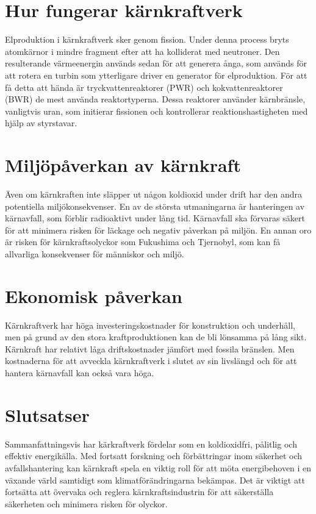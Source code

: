 \documentclass[11p]{article}
\begin{document}
    \section{Hur fungerar kärnkraftverk}
    Elproduktion i kärnkraftverk sker genom fission. Under denna process bryts atomkärnor i mindre fragment efter att ha kolliderat med neutroner. Den resulterande värmeenergin används sedan för att generera ånga, som används för att rotera en turbin som ytterligare driver en generator för elproduktion. För att få detta att hända är tryckvattenreaktorer (PWR) och kokvattenreaktorer (BWR) de mest använda reaktortyperna. Dessa reaktorer använder kärnbränsle, vanligtvis uran, som initierar fissionen och kontrollerar reaktionshastigheten med hjälp av styrstavar.\parencite{Nationalencyklopedin}

    \section{Miljöpåverkan av kärnkraft}
    Även om kärnkraften inte släpper ut någon koldioxid under drift har den andra potentiella miljökonsekvenser. En av de största utmaningarna är hanteringen av kärnavfall, som förblir radioaktivt under lång tid. Kärnavfall ska förvaras säkert för att minimera risken för läckage och negativ påverkan på miljön. En annan oro är risken för kärnkraftsolyckor som Fukushima och Tjernobyl, som kan få allvarliga konsekvenser för människor och miljö.\parencite{Naturvårdsverket}

    \section{Ekonomisk påverkan}
    Kärnkraftverk har höga investeringskostnader för konstruktion och underhåll, men på grund av den stora kraftproduktionen kan de bli lönsamma på lång sikt. Kärnkraft har relativt låga driftskostnader jämfört med fossila bränslen. Men kostnaderna för att avveckla kärnkraftverk i slutet av sin livslängd och för att hantera kärnavfall kan också vara höga.\parencite{energiforsk}

    \section{Slutsatser}
    Sammanfattningsvis har kärkraftverk fördelar som en koldioxidfri, pålitlig och effektiv energikälla. Med fortsatt forskning och förbättringar inom säkerhet och avfallshantering kan kärnkraft spela en viktig roll för att möta energibehoven i en växande värld samtidigt som klimatförändringarna bekämpas. Det är viktigt att fortsätta att övervaka och reglera kärnkraftsindustrin för att säkerställa säkerheten och minimera risken för olyckor.


    \printbibliography
\end{document}
